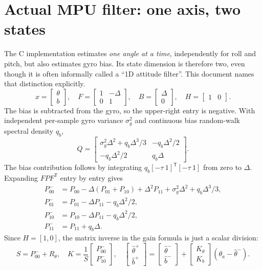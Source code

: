 \section{Actual MPU filter: one axis, two states}
The C implementation estimates \emph{one angle at a time}, independently
for roll and pitch, but also estimates gyro bias. Its state dimension is
therefore two, even though it is often informally called a ``1D attitude
filter''. This document names that distinction explicitly.
\begin{equation}
x=\begin{bmatrix}\theta\\b\end{bmatrix},\quad
F=\begin{bmatrix}1&-\Delta\\0&1\end{bmatrix},\quad
B=\begin{bmatrix}\Delta\\0\end{bmatrix},\quad H=\begin{bmatrix}1&0\end{bmatrix}.
\end{equation}
The bias is subtracted from the gyro, so the upper-right entry is negative.
With independent per-sample gyro variance $\sigma_g^2$ and continuous bias
random-walk spectral density $q_b$,
\begin{equation}
Q=\begin{bmatrix}
\sigma_g^2\Delta^2+q_b\Delta^3/3&-q_b\Delta^2/2\\
-q_b\Delta^2/2&q_b\Delta
\end{bmatrix}.
\end{equation}
The bias contribution follows by integrating
$q_b[-\tau\ 1]^{\mathsf T}[-\tau\ 1]$ from zero to $\Delta$. Expanding
$FPF^{\mathsf T}$ entry by entry gives
\begin{align}
P^-_{00}&=P_{00}-\Delta(P_{01}+P_{10})+\Delta^2P_{11}
 +\sigma_g^2\Delta^2+q_b\Delta^3/3,\\
P^-_{01}&=P_{01}-\Delta P_{11}-q_b\Delta^2/2,\\
P^-_{10}&=P_{10}-\Delta P_{11}-q_b\Delta^2/2,\\
P^-_{11}&=P_{11}+q_b\Delta.
\end{align}
Since $H=[1,0]$, the matrix inverse in the gain formula is just a scalar
division:
\begin{equation}
S=P^-_{00}+R_\theta,\quad
K=\frac{1}{S}\begin{bmatrix}P^-_{00}\\P^-_{10}\end{bmatrix},\quad
\begin{bmatrix}\hat\theta^+\\\hat b^+\end{bmatrix}
=\begin{bmatrix}\hat\theta^-\\\hat b^-\end{bmatrix}
+\begin{bmatrix}K_\theta\\K_b\end{bmatrix}(\theta_a-\hat\theta^-).
\end{equation}
